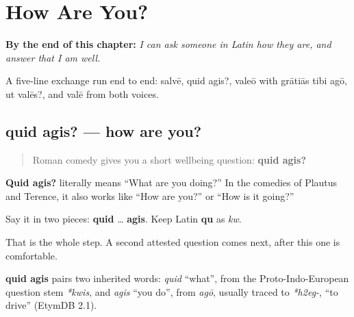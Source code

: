 
\chapter{How Are You?}
\label{ch:la-how-are-you}

\begin{chapteropening}
\textbf{By the end of this chapter:} \emph{I can ask someone in Latin how they are, and answer that I am well.}

A five-line exchange run end to end: salvē, quid agis?, valeō with grātiās tibi agō, ut valēs?, and valē from both voices.
\end{chapteropening}

\section[quid agis?]{quid agis? — how are you?}

\label{lesson:LA-C19-quid-agis}



\begin{quote}
Roman comedy gives you a short wellbeing question: \textbf{quid agis?}
\end{quote}

\begin{culture}
\textbf{Quid agis?} literally means “What are you doing?” In the comedies of Plautus and Terence, it also works like “How are you?” or “How is it going?”

Say it in two pieces: \textbf{quid} … \textbf{agis}. Keep Latin \textbf{qu} as \emph{kw}.

That is the whole step. A second attested question comes next, after this one is comfortable.
\end{culture}

\begin{cousinweb}
\textbf{quid agis} pairs two inherited words: \emph{quid} \textquotedblleft{}what\textquotedblright{}, from the Proto-Indo-European question stem \emph{*kwis}, and \emph{agis} \textquotedblleft{}you do\textquotedblright{}, from \emph{agō}, usually traced to \emph{*h2eg-}, \textquotedblleft{}to drive\textquotedblright{} (EtymDB 2.1).
\end{cousinweb}

